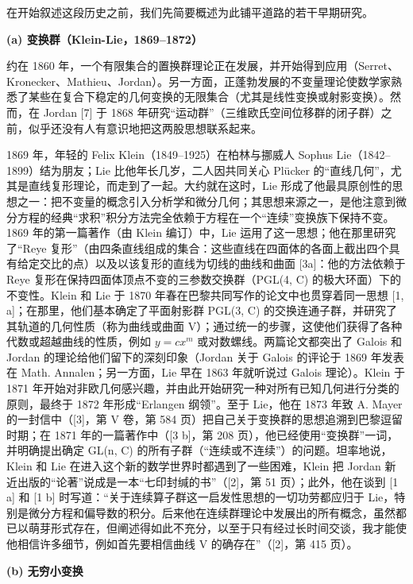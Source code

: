 在开始叙述这段历史之前，我们先简要概述为此铺平道路的若干早期研究。

\textbf{(a) 变换群（Klein-Lie，1869--1872）}

约在 1860 年，一个有限集合的置换群理论正在发展，并开始得到应用（Serret、Kronecker、Mathieu、Jordan）。另一方面，正蓬勃发展的不变量理论使数学家熟悉了某些在复合下稳定的几何变换的无限集合（尤其是线性变换或射影变换）。然而，在 Jordan {[}7{]} 于 1868 年研究“运动群”（三维欧氏空间位移群的闭子群）之前，似乎还没有人有意识地把这两股思想联系起来。

1869 年，年轻的 Felix Klein（1849--1925）在柏林与挪威人 Sophus Lie（1842--1899）结为朋友；Lie 比他年长几岁，二人因共同关心 Plücker 的“直线几何”，尤其是直线复形理论，而走到了一起。大约就在这时，Lie 形成了他最具原创性的思想之一：把不变量的概念引入分析学和微分几何；其思想来源之一，是他注意到微分方程的经典“求积”积分方法完全依赖于方程在一个“连续”变换族下保持不变。1869 年的第一篇著作（由 Klein 编订）中，Lie 运用了这一思想；他在那里研究了“Reye 复形”（由四条直线组成的集合：这些直线在四面体的各面上截出四个具有给定交比的点）以及以该复形的直线为切线的曲线和曲面 {[}3a{]}：他的方法依赖于 Reye 复形在保持四面体顶点不变的三参数交换群（PGL(4, C) 的极大环面）下的不变性。Klein 和 Lie 于 1870 年春在巴黎共同写作的论文中也贯穿着同一思想 {[}1, a{]}；在那里，他们基本确定了平面射影群 PGL(3, C) 的交换连通子群，并研究了其轨道的几何性质（称为曲线或曲面 V）；通过统一的步骤，这使他们获得了各种代数或超越曲线的性质，例如 \(y = cx^m\) 或对数螺线。两篇论文都突出了 Galois 和 Jordan 的理论给他们留下的深刻印象（Jordan 关于 Galois 的评论于 1869 年发表在 Math. Annalen；另一方面，Lie 早在 1863 年就听说过 Galois 理论）。Klein 于 1871 年开始对非欧几何感兴趣，并由此开始研究一种对所有已知几何进行分类的原则，最终于 1872 年形成“Erlangen 纲领”。至于 Lie，他在 1873 年致 A. Mayer 的一封信中（{[}3{]}，第 V 卷，第 584 页）把自己关于变换群的思想追溯到巴黎逗留时期；在 1871 年的一篇著作中（{[}3 b{]}，第 208 页），他已经使用“变换群”一词，并明确提出确定 GL(n, C) 的所有子群（“连续或不连续”）的问题。坦率地说，Klein 和 Lie 在进入这个新的数学世界时都遇到了一些困难，Klein 把 Jordan 新近出版的“论著”说成是一本“七印封缄的书”（{[}2{]}，第 51 页）；此外，他在谈到 {[}1 a{]} 和 {[}1 b{]} 时写道：“关于连续算子群这一启发性思想的一切功劳都应归于 Lie，特别是微分方程和偏导数的积分。后来他在连续群理论中发展出的所有概念，虽然都已以萌芽形式存在，但阐述得如此不充分，以至于只有经过长时间交谈，我才能使他相信许多细节，例如首先要相信曲线 V 的确存在”（{[}2{]}，第 415 页）。

\textbf{(b) 无穷小变换}

